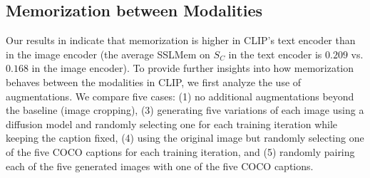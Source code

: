 \subsection{Memorization between Modalities}
Our results in  indicate that memorization is higher in CLIP's text encoder than in the image encoder (the average SSLMem on $S_C$ in the text encoder is $0.209$ vs. $0.168$ in the image encoder).
To provide further insights into how memorization behaves between the modalities in CLIP, we first analyze the use of augmentations.
We compare five cases: (1) no additional augmentations beyond the baseline (image cropping),  
(3) generating five variations of each image using a diffusion model and randomly selecting one for each training iteration while keeping the caption fixed, (4) using the original image but randomly selecting one of the five COCO captions for each training iteration, and (5) randomly pairing each of the five generated images with one of the five COCO captions.

